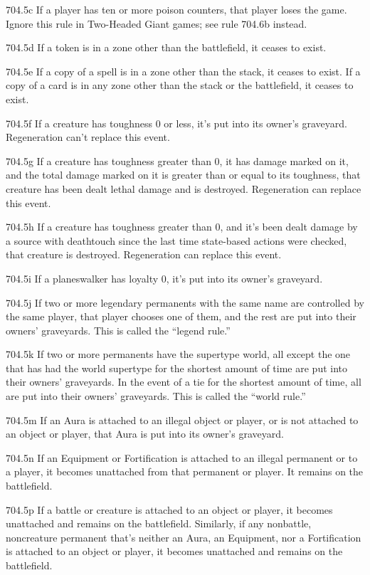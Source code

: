 704.5c If a player has ten or more poison counters, that player loses the game. Ignore this rule in Two-Headed Giant games; see rule 704.6b instead.

704.5d If a token is in a zone other than the battlefield, it ceases to exist.

704.5e If a copy of a spell is in a zone other than the stack, it ceases to exist. If a copy of a card is in any zone other than the stack or the battlefield, it ceases to exist.

704.5f If a creature has toughness 0 or less, it’s put into its owner’s graveyard. Regeneration can’t replace this event.

704.5g If a creature has toughness greater than 0, it has damage marked on it, and the total damage marked on it is greater than or equal to its toughness, that creature has been dealt lethal damage and is destroyed. Regeneration can replace this event.

704.5h If a creature has toughness greater than 0, and it’s been dealt damage by a source with deathtouch since the last time state-based actions were checked, that creature is destroyed. Regeneration can replace this event.

704.5i If a planeswalker has loyalty 0, it’s put into its owner’s graveyard.

704.5j If two or more legendary permanents with the same name are controlled by the same player, that player chooses one of them, and the rest are put into their owners’ graveyards. This is called the “legend rule.”

704.5k If two or more permanents have the supertype world, all except the one that has had the world supertype for the shortest amount of time are put into their owners’ graveyards. In the event of a tie for the shortest amount of time, all are put into their owners’ graveyards. This is called the “world rule.”

704.5m If an Aura is attached to an illegal object or player, or is not attached to an object or player, that Aura is put into its owner’s graveyard.

704.5n If an Equipment or Fortification is attached to an illegal permanent or to a player, it becomes unattached from that permanent or player. It remains on the battlefield.

704.5p If a battle or creature is attached to an object or player, it becomes unattached and remains on the battlefield. Similarly, if any nonbattle, noncreature permanent that’s neither an Aura, an Equipment, nor a Fortification is attached to an object or player, it becomes unattached and remains on the battlefield.

